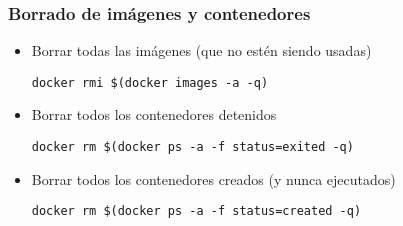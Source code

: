 \documentclass[ucs]{beamer}
\begin{document}
\begin{frame}[fragile]
\frametitle{Borrado de imágenes y contenedores}
\begin{itemize}
\item
Borrar todas las imágenes (que no estén siendo usadas)

\verb|docker rmi $(docker images -a -q)|


\item
Borrar todos los contenedores detenidos

\verb|docker rm $(docker ps -a -f status=exited -q)|

\item
Borrar todos los contenedores creados (y nunca ejecutados)

\verb|docker rm $(docker ps -a -f status=created -q)|

\end{itemize}

\end{frame}
\end{document}

